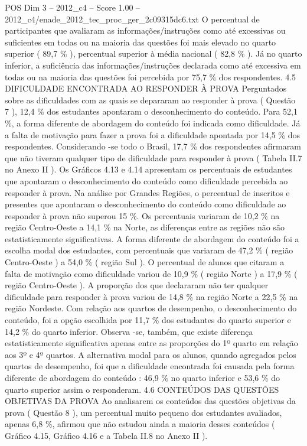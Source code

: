\begin{textsample}{POS Dim 3 – 2012\_c4 – Score 1.00 – 2012\_c4/enade\_2012\_tec\_proc\_ger\_2c09315dc6.txt}
O percentual de participantes que avaliaram as informações/instruções como até excessivas ou suficientes em todas ou na maioria das questões foi mais elevado no quarto superior ( 89,7 \% ), percentual superior à média nacional ( 82,8 \% ).
Já no quarto inferior, a suficiência das informações/instruções declarada como até excessiva em todas ou na maioria das questões foi percebida por 75,7 \% dos respondentes. 4.5 DIFICULDADE ENCONTRADA AO RESPONDER À PROVA Perguntados sobre as dificuldades com as quais se depararam ao responder à prova ( Questão 7 ), 12,4 \% dos estudantes apontaram o desconhecimento do conteúdo.
Para 52,1 \%, a forma diferente de abordagem do conteúdo foi indicada como dificuldade.
Já a falta de motivação para fazer a prova foi a dificuldade apontada por 14,5 \% dos respondentes.
Considerando -se todo o Brasil, 17,7 \% dos respondentes afirmaram que não tiveram qualquer tipo de dificuldade para responder à prova ( Tabela II.7 no Anexo II ).
Os Gráficos 4.13 e 4.14 apresentam os percentuais de estudantes que apontaram o desconhecimento do conteúdo como dificuldade percebida ao responder à prova.
Na análise por Grandes Regiões, o percentual de inscritos e presentes que apontaram o desconhecimento do conteúdo como dificuldade ao responder à prova não superou 15 \%.
Os percentuais variaram de 10,2 \% na região Centro-Oeste a 14,1 \% na Norte, as diferenças entre as regiões não são estatisticamente significativas.
A forma diferente de abordagem do conteúdo foi a escolha modal dos estudantes, com percentuais que variaram de 47,2 \% ( região Centro-Oeste ) a 54,0 \% ( região Sul ).
O percentual de alunos que citaram a falta de motivação como dificuldade variou de 10,9 \% ( região Norte ) a 17,9 \% ( região Centro-Oeste ).
A proporção dos que declararam não ter qualquer dificuldade para responder à prova variou de 14,8 \% na região Norte a 22,5 \% na região Nordeste.
Com relação aos quartos de desempenho, o desconhecimento do conteúdo, foi a opção escolhida por 11,7 \% dos estudantes do quarto superior e 14,2 \% do quarto inferior.
Observa -se, também, que existe diferença estatisticamente significativa apenas entre as proporções do 1º quarto em relação aos 3º e 4º quartos.
A alternativa modal para os alunos, quando agregados pelos quartos de desempenho, foi que a dificuldade encontrada foi causada pela forma diferente de abordagem do conteúdo : 46,9 \% no quarto inferior e 53,6 \% do quarto superior assim o responderam. 4.6 CONTEÚDOS DAS QUESTÕES OBJETIVAS DA PROVA Ao analisarem os conteúdos das questões objetivas da prova ( Questão 8 ), um percentual muito pequeno dos estudantes avaliados, apenas 6,8 \%, afirmou que não estudou ainda a maioria desses conteúdos ( Gráfico 4.15, Gráfico 4.16 e a Tabela II.8 no Anexo II ).

\end{textsample}
